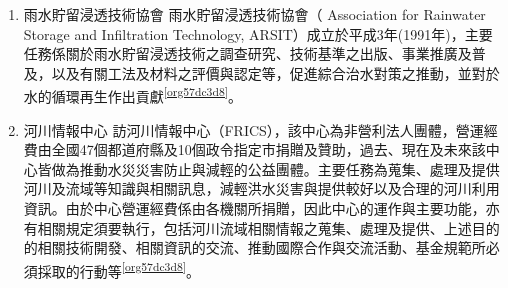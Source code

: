 \documentclass[a4paper,12pt]{article}
\begin{document}
\begin{enumerate}
東京都隨都市化進展，降雨逕流大增，水害頻繁威脅住民生命財產安全，遂推展「中小河川流域治水計畫」，重新建立下水道的排水標準，將設計標準從 3 年頻率降雨強度 50.0mm/hr，提昇至 15 年頻率降雨強度75.0mm/hr 以上。除了提高老舊的下水道（排水路）、抽水站的排水標準外，也加入蓄洪、入滲、貯留、系統預測、土地管制檢討等減洪思維，新建地下調節池及雨水貯留管。地下調節池可疏導調節 25％之洪水量。\\

在建立地下調節池及雨水貯留管的初期，日本政府曾被質疑為何不直接浚深河川，透過增加通水斷面減少水患。浚深河川的難處在於，日本都市化發展飽和，許多河川水道之下已佈滿地鐵、自來水、瓦斯等設施管線，因此改以建立地下調節池及雨水貯留管來提昇排水標準。未來台北市也可能面臨類似問題，加上潮汐迴水的問題，可將地下調節池及雨水貯留管列為長期的規劃目標。惟興建此類設施的人力、時間、經費成本都極為巨大，政府應讓公民更加深入了解此議題，促進未來的政策透明及規劃方向\footnote{\href{https://pansci.asia/archives/75374}{若大禹再世（一）：治水策略 學日荷，好不好？}\\}。\\

\item 雨水貯留浸透技術協會
\label{sec:org88cc552}
雨水貯留浸透技術協會（ Association for Rainwater Storage and Infiltration Technology, ARSIT）成立於平成3年(1991年)，主要任務係關於雨水貯留浸透技術之調查研究、技術基準之出版、事業推廣及普及，以及有關工法及材料之評價與認定等，促進綜合治水對策之推動，並對於水的循環再生作出貢獻\textsuperscript{\ref{org57dc3d8}}。\\

\item 河川情報中心
\label{sec:orge60e653}
訪河川情報中心（FRICS），該中心為非營利法人團體，營運經費由全國47個都道府縣及10個政令指定市捐贈及贊助，過去、現在及未來該中心皆做為推動水災災害防止與減輕的公益團體。主要任務為蒐集、處理及提供河川及流域等知識與相關訊息，減輕洪水災害與提供較好以及合理的河川利用資訊。由於中心營運經費係由各機關所捐贈，因此中心的運作與主要功能，亦有相關規定須要執行，包括河川流域相關情報之蒐集、處理及提供、上述目的的相關技術開發、相關資訊的交流、推動國際合作與交流活動、基金規範所必須採取的行動等\textsuperscript{\ref{org57dc3d8}}。\\


\end{enumerate}
\end{document}
